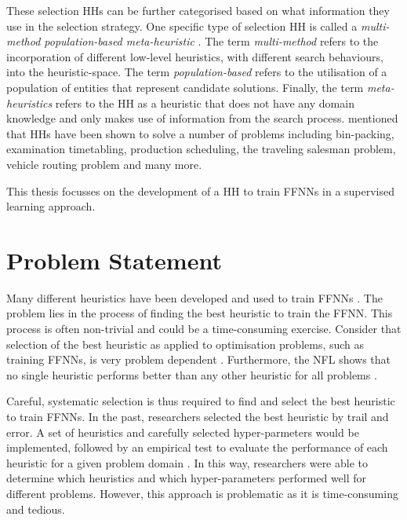 These selection \acp{HH} can be further categorised based on what information
they use in the selection strategy. One specific type of selection \ac{HH} is
called a \textit{multi-method
population-based meta-heuristic}
\cite{ref:vanderstockt:2018}. The term \textit{multi-method}
refers to the incorporation of different low-level heuristics, with different
search behaviours, into the heuristic-space. The term \textit{population-based}
refers to the utilisation of a population of entities that represent candidate
solutions. Finally, the term \textit{meta-heuristics}
refers to the \ac{HH} as a heuristic that does not have any domain knowledge and
only makes use of information from the search process.
\citeauthor{ref:grobler:2015} \cite{ref:grobler:2015} mentioned that \acp{HH}
have been shown to solve a number of problems including bin-packing, examination
timetabling, production scheduling, the traveling salesman problem, vehicle
routing problem and many more.

This thesis focusses on the development of a \ac{HH} to train \acp{FFNN} in a
supervised learning approach.

\section{Problem Statement}
\label{sec:introduction:problem}

Many different heuristics have been developed and used to train \acp{FFNN}
\cite{ref:gudise:2003, ref:rakitianskaia:2012, ref:montana:1989}.  The problem
lies in the process of finding the best heuristic to train the \ac{FFNN}. This
process is often non-trivial and could be a time-consuming exercise.  Consider
that selection of the best heuristic as applied to optimisation problems, such
as training \acp{FFNN}, is very problem dependent \cite{ref:allen:1996,
ref:drake:2020, ref:pillay:2018}. Furthermore, the \ac{NFL} shows that no single
heuristic performs better than any other heuristic for all problems
\cite{ref:wolpert:1997}.

Careful, systematic selection is thus required to find and select the best
heuristic to train \acp{FFNN}. In the past, researchers selected the best
heuristic by trail and error. A set of heuristics and carefully selected
hyper-parmeters would be implemented, followed by an empirical test to evaluate
the performance of each heuristic for a given problem domain
\cite{ref:pillay:2015}. In this way, researchers were able to determine which
heuristics and which hyper-parameters performed well for different problems.
However, this approach is problematic as it is time-consuming and tedious.


